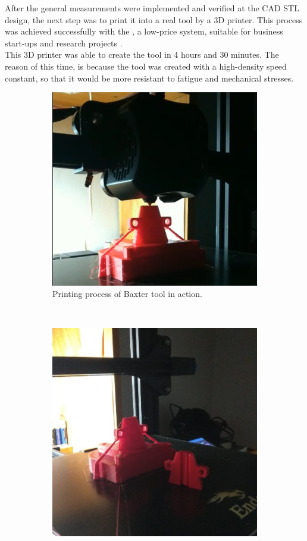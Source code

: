 \documentclass[11pt]{report} %
\begin{document}
After the general measurements were implemented and verified at the CAD STL design, the next step was to print it into a real tool by a 3D printer. This process was achieved successfully with the , a low-price system, suitable for business start-ups and research projects \citep{cite_3d_printer_for_tool}.\\

This 3D printer was able to create the tool in 4 hours and 30 minutes. The reason of this time, is because the tool was created with a high-density speed constant, so that it would be more resistant to fatigue and mechanical stresses.\\

\begin{figure}[H]
	\centering
	\begin{subfigure}{.5\textwidth}
		\centering
		\includegraphics[width=0.87\linewidth]{assets/imgs/baxter_robot/baxter_spoon_process_printing.png}
		\caption{Printing process of Baxter tool in action.}
		\label{fig_3d_prniter_in_action_1}
	\end{subfigure}~
	\begin{subfigure}{.5\textwidth}
		\centering
		\includegraphics[width=0.8\linewidth]{assets/imgs/baxter_robot/baxter_spoon_process_end.jpeg}

\end{subfigure}
\end{figure}
\end{document}
